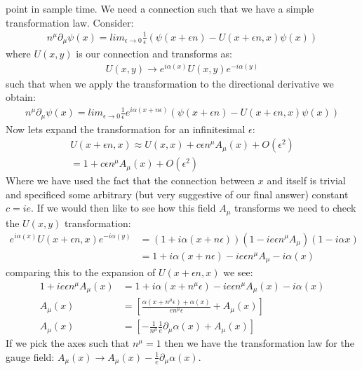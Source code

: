 point in sample time. We need a connection such that we have a simple transformation law. Consider:
\begin{align*}
n^\mu \partial _\mu \psi (x) = lim_{\epsilon\rightarrow 0} \frac{1}{\epsilon} \left ( \psi(x + \epsilon n) - U(x+\epsilon n, x) \psi(x) \right)
\end{align*}
where $U(x,y)$ is our connection and transforms as:
\begin{align*}
U(x,y) \rightarrow e^{i\alpha(x)} U(x,y) e^{-i\alpha (y)}
\end{align*}
such that when we apply the transformation to the directional derivative we obtain:
\begin{align*}
n^\mu \partial _\mu \psi (x) = lim_{\epsilon\rightarrow 0} \frac{1}{\epsilon} e^{i\alpha(x+n\epsilon)} \left ( \psi(x + \epsilon n) - U(x+\epsilon n, x) \psi(x) \right)
\end{align*}
Now lets expand the transformation for an infinitesimal $\epsilon$:
\begin{align*}
U(x+\epsilon n, x) \approx U(x,x) + c\epsilon n^\mu A_\mu (x) + O(\epsilon^2)\\
= 1 + c\epsilon n^\mu A_\mu (x) + O(\epsilon^2)
\end{align*}
Where we have used the fact that the connection between $x$ and itself is trivial and specificed some arbitrary (but very suggestive of our final answer) constant $c = ie$.
If we would then like to see how this field $A_\mu$ transforms we need to check the $U(x,y)$ transformation:
\begin{align*}
e^{i\alpha(x)} U(x+\epsilon n,x) e^{-i\alpha (y)} &= (1 + i \alpha(x+n\epsilon)) (1-ie\epsilon n^\mu A_\mu)(1 - i \alpha x) \\
&= 1 + i \alpha (x+n\epsilon ) - ie \epsilon n^\mu A_\mu - i\alpha(x)
\end{align*}
comparing this to the expansion of $U(x+\epsilon n, x)$ we see:
\begin{align*}
1 + ie\epsilon n^\mu A_\mu (x) &= 1 + i \alpha (x+n^\mu\epsilon ) - ie \epsilon n^\mu A_\mu(x) - i\alpha(x)\\
A_\mu(x) &=  \left [ \frac{\alpha(x+n^\mu\epsilon) + \alpha(x)}{en^\mu \epsilon} + A_\mu(x) \right] \\
A_\mu(x) &=  \left [ -\frac{1}{n^\mu}\frac{1}{e}\partial_\mu \alpha(x) + A_\mu(x) \right]
\end{align*}
If we pick the axes such that $n^\mu = 1$ then we have the transformation law for the gauge field: $A_\mu(x) \rightarrow A_\mu(x) - \frac{1}{e} \partial_\mu \alpha(x)$. 

